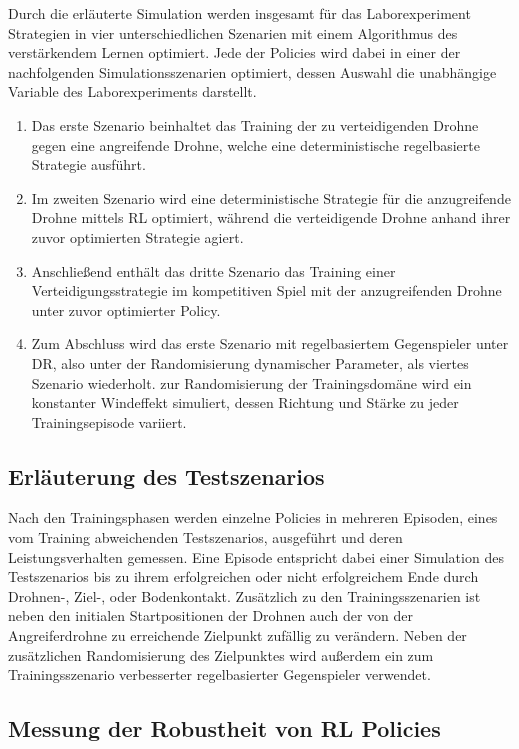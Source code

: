 Durch die erläuterte Simulation werden insgesamt für das Laborexperiment Strategien in vier unterschiedlichen Szenarien mit einem Algorithmus des verstärkendem Lernen optimiert.
Jede der Policies wird dabei in einer der nachfolgenden Simulationsszenarien optimiert, dessen Auswahl die unabhängige Variable des Laborexperiments darstellt.
\begin{enumerate}
    \item Das erste Szenario beinhaltet das Training der zu verteidigenden Drohne gegen eine angreifende Drohne, welche eine deterministische regelbasierte Strategie ausführt.
    \item Im zweiten Szenario wird eine deterministische Strategie für die anzugreifende Drohne mittels RL optimiert, während die verteidigende Drohne anhand ihrer zuvor optimierten Strategie agiert.
    \item Anschließend enthält das dritte Szenario das Training einer Verteidigungsstrategie im kompetitiven Spiel mit der anzugreifenden Drohne unter zuvor optimierter Policy.
    \item Zum Abschluss wird das erste Szenario mit regelbasiertem Gegenspieler unter DR, also unter der Randomisierung dynamischer Parameter, als viertes Szenario wiederholt. 
    zur Randomisierung der Trainingsdomäne wird ein konstanter Windeffekt simuliert, dessen Richtung und Stärke zu jeder Trainingsepisode variiert. 
\end{enumerate}

\subsection{Erläuterung des Testszenarios}

Nach den Trainingsphasen werden einzelne Policies in mehreren Episoden, eines vom Training abweichenden Testszenarios, ausgeführt und deren Leistungsverhalten gemessen.
Eine Episode entspricht dabei einer Simulation des Testszenarios bis zu ihrem erfolgreichen oder nicht erfolgreichem Ende durch Drohnen-, Ziel-, oder Bodenkontakt.
Zusätzlich zu den Trainingsszenarien ist neben den initialen Startpositionen der Drohnen auch der von der Angreiferdrohne zu erreichende Zielpunkt zufällig zu verändern.
Neben der zusätzlichen Randomisierung des Zielpunktes wird außerdem ein zum Trainingsszenario verbesserter regelbasierter Gegenspieler verwendet.

\subsection{Messung der Robustheit von RL Policies}


